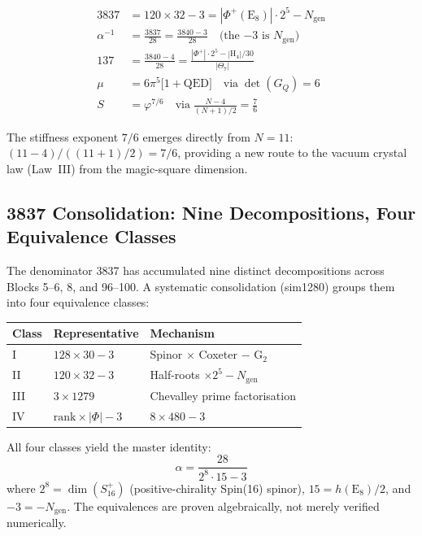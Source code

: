 \documentclass[aps,prd,twocolumn,superscriptaddress,floatfix,nofootinbib]{revtex4-2}
\theoremstyle{definition}
\theoremstyle{remark}
\newcommand{\vp}{\varphi}
\begin{document}
\begin{align}
3837 &= 120\times 32 - 3 = |\Phi^+(\mathrm{E}_8)|\cdot 2^5 - N_{\mathrm{gen}}
\label{eq:3837-from-n11} \\
\alpha^{-1} &= \frac{3837}{28} = \frac{3840 - 3}{28}
\quad\text{(the $-3$ is $N_{\mathrm{gen}}$)}
\label{eq:alpha-from-3837} \\
137 &= \frac{3840 - 4}{28} = \frac{|\Phi^+|\cdot 2^5 - |\mathrm{H}_4|/30}{|\Theta_7|}
\label{eq:137-from-chain} \\
\mu &= 6\pi^5\bigl[1 + \text{QED}\bigr]
\quad\text{via}\; \det(G_Q) = 6
\label{eq:mu-from-det} \\
S &= \vp^{7/6}
\quad\text{via}\; \frac{N-4}{(N+1)/2} = \frac{7}{6}
\label{eq:s-from-n11}
\end{align}

\noindent
The stiffness exponent $7/6$ emerges directly from $N{=}11$:
$(11-4)/((11+1)/2) = 7/6$, providing a new route to the vacuum crystal
law (Law~III) from the magic-square dimension.

\subsection{3837 Consolidation: Nine Decompositions, Four Equivalence Classes}
\label{sec:3837-consolidation}

The denominator 3837 has accumulated nine distinct decompositions across
Blocks 5--6, 8, and 96--100.  A systematic consolidation (sim1280) groups
them into four equivalence classes:

\begin{center}
\begin{tabular}{lll}
\toprule
Class & Representative & Mechanism \\
\midrule
I   & $128\times 30 - 3$
    & Spinor $\times$ Coxeter $-$ G$_2$ \\
II  & $120\times 32 - 3$
    & Half-roots $\times 2^5 - N_{\mathrm{gen}}$ \\
III & $3\times 1279$
    & Chevalley prime factorisation \\
IV  & $\mathrm{rank}\times|\Phi| - 3$
    & $8\times 480 - 3$ \\
\bottomrule
\end{tabular}
\end{center}

\noindent
All four classes yield the master identity:
\begin{equation}
\alpha = \frac{28}{2^8\cdot 15 - 3}
\label{eq:alpha-master}
\end{equation}
where $2^8 = \dim(S^+_{16})$ (positive-chirality Spin(16) spinor),
$15 = h(\mathrm{E}_8)/2$, and $-3 = -N_{\mathrm{gen}}$.  The
equivalences are proven algebraically, not merely verified numerically.
\end{document}
